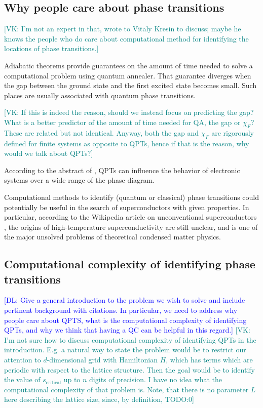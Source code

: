 \documentclass[american,aps,pra,reprint,floatfix,nofootinbib,superscriptaddress]{revtex4-2}
\newcommand{\VK}[1]{\textcolor{teal}{[VK: #1]}}
\newcommand{\DL}[1]{\textcolor{blue}{[DL: #1]}}
\begin{document}
\subsection{Why people care about phase transitions}
\VK{I'm not an expert in that, wrote to Vitaly Kresin to discuss;
maybe he knows the people who do care about computational method
for identifying the locations of phase transitions.}

Adiabatic theorems provide guarantees on the
amount of time needed to solve a computational problem
using quantum annealer. That guarantee diverges when the gap
between the ground state and the first excited state
becomes small. Such places are usually associated with quantum
phase transitions.

\VK{If this is indeed the reason, should we instead focus
on predicting the gap? What is a better predictor of the
amount of time needed for QA, the gap or $\chi_{F}$? These are related but not
identical. Anyway, both the gap and $\chi_{F}$ are rigorously defined
for finite systems as opposite to QPTs, hence if that is the reason,
why would we talk about QPTs?}

According to the abstract of \cite{vojta2003quantum}, QPTs can influence the
behavior of electronic systems over a wide range of the phase diagram.

Computational methods to identify (quantum or classical) phase transitions
could potentially
be useful in the search of superconductors with given properties.
In particular, according to the Wikipedia article on unconventional
superconductors \cite{wiki-unconventional-superconductor}, the
origins of high-temperature superconductivity are still unclear,
and is one of the major unsolved problems of theoretical condensed matter
physics.

\subsection{Computational complexity of identifying phase transitions}

\DL{Give a general introduction to the problem we wish to solve and include pertinent background with citations. In particular, we need to address why people care about QPTS, what is the computational complexity of identifying QPTs, and why we think that having a QC can be helpful in this regard.}
\VK{I'm not sure how to discuss computational complexity of identifying QPTs in
the introduction. E.g. a natural way to state the problem would be to
restrict our attention to $d$-dimensional grid with Hamiltonian $H$, which
has terms which are periodic with respect to the lattice structure.
Then the goal would be to identify the value of $s_{\textrm{critical}}$ up to
$n$ digits of precision. I have no idea what the computational complexity of
that problem is. Note, that there is no parameter $L$ here describing the
lattice size, since, by definition, TODO:0}
\end{document}
